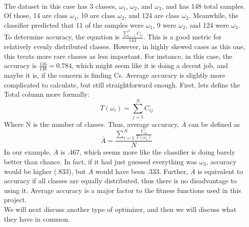 \\The dataset in this case has 3 classes, $\omega_1$, $\omega_2$, and $\omega_3$, and has 148 total samples.  Of those, 14 are class $\omega_1$, 10 are class $\omega_2$, and 124 are class $\omega_3$.  Meanwhile, the classifier predicted that 11 of the samples were $\omega_1$, 9 were $\omega_2$, and 124 were $\omega_3$.  To determine accuracy, the equation is $\frac{\sum_{i=1}^{3}C_{ii}}{144}$.  This is a good metric for relatively evenly distributed classes.  However, in highly skewed cases as this one, this treats more rare classes as less important.  For instance, in this case, the accuracy is $\frac{116}{148} = 0.784$, which might seem like it is doing a decent job, and maybe it is, if the concern is finding Cs.  Average accuracy is slightly more complicated to calculate, but still straightforward enough.  First, lets define the Total column more formally: $$T(\omega_i)=\sum_{j=1}^{N}C_{ij}$$
Where N is the number of classes.  Thus, average accuracy, $\overline{A}$ can be defined as $$\overline{A} = \frac{\sum_{i=1}^{N}\frac{C_{ii}}{T(\omega_i)}} {N}$$
In our example, $\overline{A}$ is .467, which seems more like the classifier is doing barely better than chance.  In fact, if it had just guessed everything was $\omega_3$, accuracy would be higher (.833), but $\overline{A}$ would have been .333.  Further, $\overline{A}$ is equivalent to accuracy if all classes are equally distributed, thus there is no disadvantage to using it.  Average accuracy is a major factor to the fitness functions used in this project.\\
We will next discuss another type of optimizer, and then we will discuss what they have in common.

